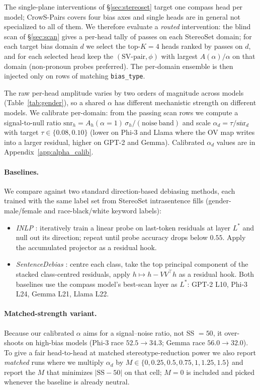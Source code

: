 The single-plane interventions of \S\ref{sec:stereoset} target one
compass head per model; CrowS-Pairs covers four bias axes and single
heads are in general not specialized to all of them. We therefore
evaluate a \emph{routed} intervention: the blind scan of
\S\ref{sec:scan} gives a per-head tally of passes on each StereoSet
domain; for each target bias domain $d$ we select the top-$K{=}4$
heads ranked by passes on $d$, and for each selected head keep the
$(\mathrm{SV}\text{-pair}, \phi)$ with largest $A(\alpha)/\alpha$ on
that domain (non-pronoun probes preferred). The per-domain ensemble
is then injected only on rows of matching \texttt{bias\_type}.

The raw per-head amplitude varies by two orders of magnitude across
models (Table~\ref{tab:gender}), so a shared $\alpha$ has different
mechanistic strength on different models. We calibrate per-domain:
from the passing scan rows we compute a signal-to-null ratio
$\mathrm{snr}_h = A_h(\alpha{=}1)\,\sigma_h / (\mathrm{noise\ band})$
and scale $\alpha_d = \tau / \overline{\mathrm{snr}}_{d}$ with target
$\tau \in \{0.08, 0.10\}$ (lower on Phi-3 and Llama where the OV map
writes into a larger residual, higher on GPT-2 and Gemma). Calibrated
$\alpha_d$ values are in Appendix~\ref{app:alpha_calib}.

\paragraph{Baselines.} We compare against two standard direction-based
debiasing methods, each trained with the same label set from StereoSet
intrasentence fills (gender-male/female and race-black/white keyword
labels):

\begin{itemize}
    \item \emph{INLP} \citep{ravfogel2020inlp}: iteratively train a
    linear probe on last-token residuals at layer $L^*$ and null out
    its direction; repeat until probe accuracy drops below $0.55$.
    Apply the accumulated projector as a residual hook.
    \item \emph{SentenceDebias} \citep{liang2020sentdebias}: centre
    each class, take the top principal component of the stacked
    class-centred residuals, apply $h \mapsto h - VV^{\top}h$ as a
    residual hook. Both baselines use the compass model's best-scan
    layer as $L^*$: GPT-2 L10, Phi-3 L24, Gemma L21, Llama L22.
\end{itemize}

\paragraph{Matched-strength variant.} Because our calibrated $\alpha$
aims for a signal--noise ratio, not SS $=50$, it over-shoots on
high-bias models (Phi-3 race $52.5 \to 34.3$; Gemma race $56.0 \to
32.0$). To give a fair head-to-head at matched stereotype-reduction
power we also report \emph{matched} runs where we multiply $\alpha_d$
by $M \in \{0, 0.25, 0.5, 0.75, 1, 1.25, 1.5\}$ and report the $M$
that minimizes $|\mathrm{SS}-50|$ on that cell; $M{=}0$ is included
and picked whenever the baseline is already neutral.

